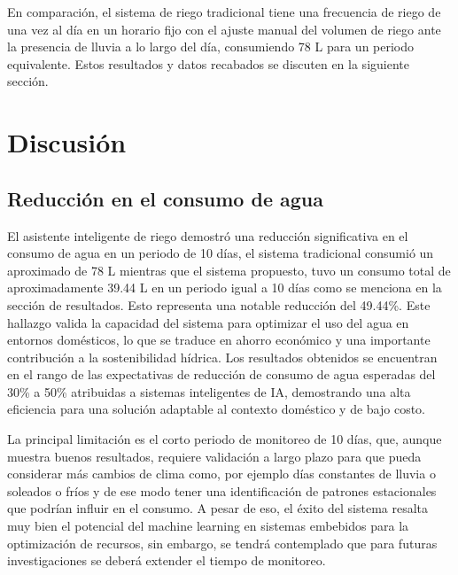 \documentclass[pdflatex,sn-mathphys-num]{sn-jnl}%
\theoremstyle{thmstyleone}%
\theoremstyle{thmstyletwo}%
\theoremstyle{thmstylethree}%
\begin{document}
\begin{multicols}{2}
  
En comparación, el sistema de riego tradicional tiene una frecuencia de riego de una vez al día en un horario fijo con el ajuste manual del volumen de riego ante la presencia de lluvia a lo largo del día, consumiendo 78 L para un periodo equivalente. Estos resultados y datos recabados se discuten en la siguiente sección.

\section*{Discusión}

\subsection*{Reducción en el consumo de agua}

El asistente inteligente de riego demostró una reducción significativa en el consumo de agua en un periodo de 10 días, el sistema tradicional consumió un aproximado de 78 L mientras que el sistema propuesto, tuvo un consumo total de aproximadamente 39.44 L en un periodo igual a 10 días como se menciona en la sección de resultados. Esto representa una notable reducción del 49.44\%. Este hallazgo valida la capacidad del sistema para optimizar el uso del agua en entornos domésticos, lo que se traduce en ahorro económico y una importante contribución a la sostenibilidad hídrica. Los resultados obtenidos se encuentran en el rango de las expectativas de reducción de consumo de agua esperadas del 30\% a 50\% atribuidas a sistemas inteligentes de IA, demostrando una alta eficiencia para una solución adaptable al contexto doméstico y de bajo costo.

La principal limitación es el corto periodo de monitoreo de 10 días, que, aunque muestra buenos resultados, requiere validación a largo plazo para que pueda considerar más cambios de clima como, por ejemplo días constantes de lluvia o soleados o fríos y de ese modo tener una identificación de patrones estacionales que podrían influir en el consumo. A pesar de eso, el éxito del sistema resalta muy bien el potencial del machine learning en sistemas embebidos para la optimización de recursos, sin embargo, se tendrá contemplado que para futuras investigaciones se deberá extender el tiempo de monitoreo.


\end{multicols}
\end{document}
